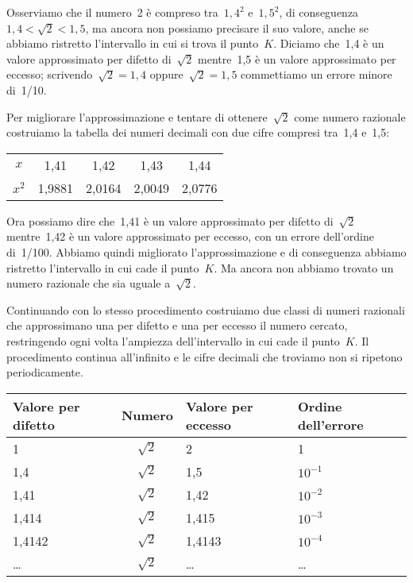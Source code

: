 Osserviamo che il numero~2 è compreso tra~\(1,4^{2}\) e~\(1,5^{2}\),
di conseguenza~\(1,4<\sqrt{2}<1,5\), ma ancora
non possiamo precisare il suo valore, anche se abbiamo ristretto
l'intervallo in cui si trova il punto~\(K\). Diciamo che~1,4 è un valore 
approssimato per difetto di~\(\sqrt{2}\) mentre~1,5
è un valore approssimato per eccesso; scrivendo~\(\sqrt{2}=1,4\)
oppure~\(\sqrt{2}=1,5\) commettiamo un errore minore di~1/10.

Per migliorare l'approssimazione e tentare di ottenere~\(\sqrt{2}\)
come numero razionale costruiamo la tabella dei numeri
decimali con due cifre compresi tra~1,4 e~1,5:

\begin{center}
\begin{tabular}{ccccc}
\toprule
\(x\) &1,41 &1,42 &1,43 &1,44\\
\(x^{2}\) & 1,9881 & 2,0164 & 2,0049 & 2,0776\\
\bottomrule
\end{tabular}
\end{center}

Ora possiamo dire che~1,41 è un valore approssimato per difetto di~\(\sqrt{2}\) 
mentre~1,42 è un valore approssimato per eccesso, con un errore 
dell'ordine di~1/100. Abbiamo quindi migliorato l'approssimazione e di 
conseguenza abbiamo ristretto l'intervallo in cui cade il punto~\(K\). 
Ma ancora non abbiamo trovato un numero razionale che sia uguale a~\(\sqrt{2}\).

Continuando con lo stesso procedimento costruiamo due classi di numeri 
razionali che approssimano una per difetto e una per eccesso il numero 
cercato, restringendo ogni volta l'ampiezza dell'intervallo in cui cade 
il punto~\(K\).
Il procedimento continua all'infinito e le cifre decimali che troviamo non 
si ripetono periodicamente.

\begin{center}
 \begin{tabular}{lcll}
\toprule
Valore per difetto & Numero &Valore per eccesso & Ordine dell'errore\\
\midrule
1	& \(\sqrt{2}\) 	& 2 	&1\\
1,4	& \(\sqrt{2}\)	&1,5 	& \(10^{-1}\)\\
1,41	& \(\sqrt{2}\)	& 1,42	& \(10^{-2}\)\\
1,414	& \(\sqrt{2}\)	&1,415	&\(10^{-3}\)\\
1,4142	& \(\sqrt{2}\)	& 1,4143&\(10^{-4}\)\\
\ldots	& \(\sqrt{2}\)	&\ldots	&\ldots\\
\bottomrule
\end{tabular}
\end{center}

